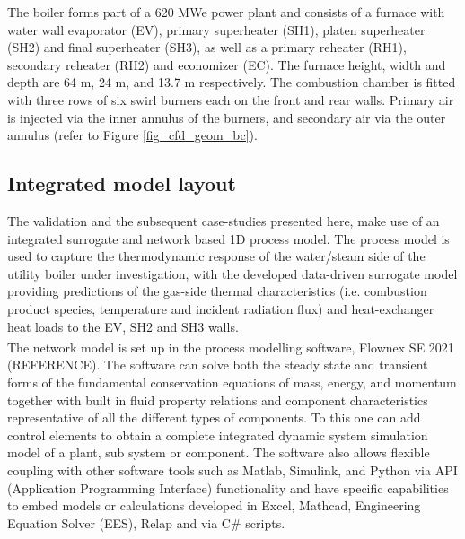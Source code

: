 \documentclass[a4paper,fleqn]{cas-dc}
\begin{document}
The boiler forms part of a 620 MWe power plant and consists of a furnace with water wall evaporator (EV), primary superheater (SH1), platen superheater (SH2) and final superheater (SH3), as well as a primary reheater (RH1), secondary reheater (RH2) and economizer (EC).  The furnace height, width and depth are 64 m, 24 m, and 13.7 m respectively.  The combustion chamber is fitted with three rows of six swirl burners each on the front and rear walls.  Primary air is injected via the inner annulus of the burners, and secondary air via the outer annulus (refer to Figure \ref{fig_cfd_geom_bc}).

\subsection{Integrated model layout}

The validation and the subsequent case-studies presented here, make use of an integrated surrogate and network based 1D process model. The process model is used to capture the thermodynamic response of the water/steam side of the utility boiler under investigation, with the developed data-driven surrogate model providing predictions of the gas-side thermal characteristics (i.e. combustion product species, temperature and incident radiation flux) and heat-exchanger heat loads to the EV, SH2 and SH3 walls.\\

The network model is set up in the process modelling software, Flownex SE\textsuperscript{\textregistered} 2021 (REFERENCE).  The software can solve both the steady state and transient forms of the fundamental conservation equations of mass, energy, and momentum together with built in fluid property relations and component characteristics representative of all the different types of components.  To this one can add control elements to obtain a complete integrated dynamic system simulation model of a plant, sub system or component. The software also allows flexible coupling with other software tools such as Matlab, Simulink, and Python via API (Application Programming Interface) functionality and have specific capabilities to embed models or calculations developed in Excel, Mathcad, Engineering Equation Solver (EES), Relap and via C# scripts. 
\end{document}
